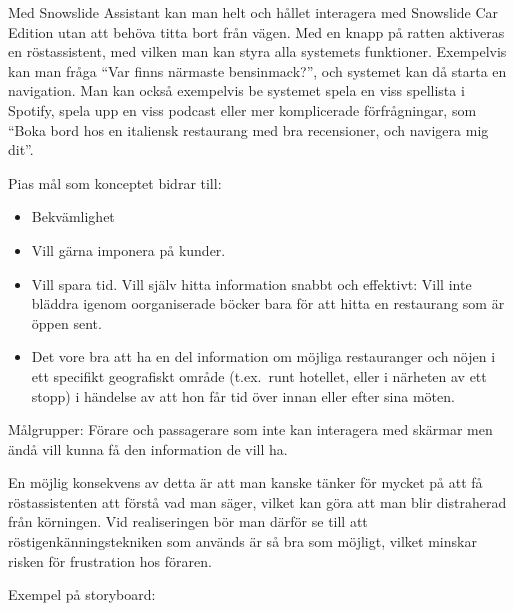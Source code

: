 \documentclass[a4paper,12pt,titlepage]{article}
\begin{document}
Med Snowslide Assistant kan man helt och hållet interagera med Snowslide Car
Edition utan att behöva titta bort från vägen. Med en knapp på ratten aktiveras
en röstassistent, med vilken man kan styra alla systemets funktioner.
Exempelvis kan man fråga ``Var finns närmaste bensinmack?'', och systemet kan då
starta en navigation. Man kan också exempelvis be systemet spela en viss spellista i Spotify,
spela upp en viss podcast eller mer komplicerade förfrågningar, som ``Boka bord
hos en italiensk restaurang med bra recensioner, och navigera mig dit''.

Pias mål som konceptet bidrar till:
\begin{itemize}
    \item Bekvämlighet
    \item Vill gärna imponera på kunder.
    \item Vill spara tid. Vill själv hitta
        information snabbt och effektivt: Vill
        inte bläddra igenom oorganiserade
        böcker bara för att hitta en restaurang
        som är öppen sent.
    \item Det vore bra att ha en del
        information om möjliga restauranger
        och nöjen i ett specifikt geografiskt
        område (t.ex.\ runt hotellet, eller i
        närheten av ett stopp) i händelse av
        att hon får tid över innan eller efter
        sina möten. 
\end{itemize}

Målgrupper: Förare och passagerare som inte kan interagera med skärmar men ändå
vill kunna få den information de vill ha.

En möjlig konsekvens av detta är att man kanske tänker för mycket på att få
röstassistenten att förstå vad man säger, vilket kan göra att man blir
distraherad från körningen. Vid realiseringen bör man därför se till att
röstigenkänningstekniken som används är så bra som möjligt, vilket minskar
risken för frustration hos föraren.

\newpage
Exempel på storyboard:
\end{document}
